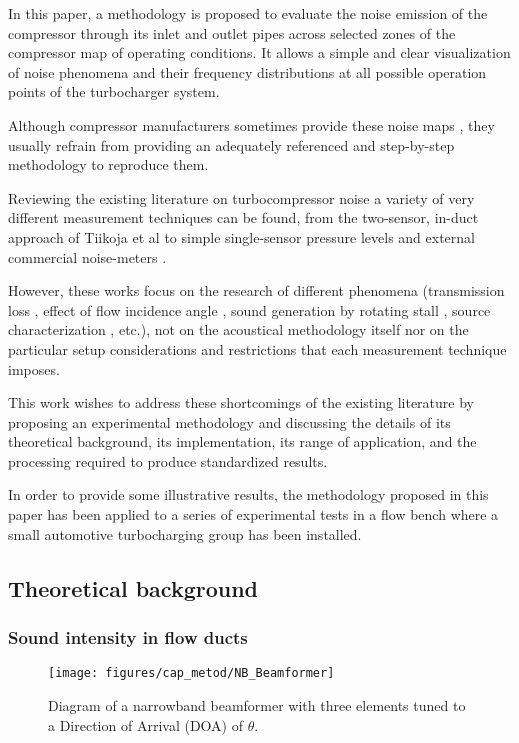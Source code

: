 In this paper, a methodology is proposed to evaluate the noise emission of the compressor through its inlet and outlet pipes across selected zones of the compressor map of operating conditions. It allows a simple and clear visualization of noise phenomena and their frequency distributions at all  possible operation points of the turbocharger system.

Although compressor manufacturers sometimes provide these noise maps \cite{gaude2008experimental}, they usually refrain from providing an adequately referenced and step-by-step methodology to reproduce them.

Reviewing the existing literature on turbocompressor noise a variety of very different measurement techniques can be found, from the two-sensor, in-duct approach of Tiikoja et al \cite{tiikoja2011inves} to simple single-sensor pressure levels and external commercial noise-meters \cite{figurella2012noise}.

However, these works focus on the research of different phenomena (transmission loss \cite{tiikoja2011inves}, effect of flow incidence angle \cite{figurella2012noise}, sound generation by rotating stall \cite{mongeau1993sound}, source characterization \cite{mongeau1995method}, etc.), not on the acoustical methodology itself nor on the particular setup considerations and restrictions that each measurement technique imposes.

This work wishes to address these shortcomings of the existing literature by proposing an experimental methodology and discussing the details of its theoretical background, its implementation, its range of application, and the  processing required to produce standardized results.

In order to provide some illustrative results, the methodology proposed in this paper has been applied to a series of experimental tests in a flow bench where a small automotive turbocharging group has been installed.

\subsection{Theoretical background}
\label{sec:theory}

\subsubsection{Sound intensity in flow ducts}
\label{sub:sound_intensity_in_flow_ducts}

\begin{figure}[h!]
\centering
\texttt{[image: figures/cap\_metod/NB\_Beamformer]}
\caption{Diagram of a narrowband beamformer with three elements tuned to a Direction of Arrival (DOA) of $\theta$.}
\label{fig:schematic}
\end{figure}



